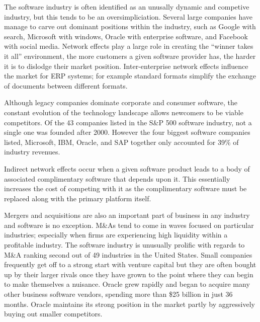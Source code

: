 The software industry is often identified as an unusally dynamic and competive industry, but this tends to be an oversimpliciation.
Several large companies have manage to carve out dominant positions within the industry, such as Google with search, Microsoft with windows, Oracle with enterprise software, and Facebook with social media.\autocite[34]{IndustrySurveysInternet}
Network effects play a large role in creating the ``winner takes it all'' environment, the more customers a given software provider has, the harder it is to dislodge their market position.\autocite[21]{buxmann2012software}
Inter-enterprise network effects influence the market for ERP systems; for example standard formats simplify the exchange of documents between different formats.\autocite[21]{buxmann2012software}

Although legacy companies dominate corporate and consumer software, the constant evolution of the technology landscape allows newcomers to be viable competitors.\autocite[38]{SurveysSoftware2015}
Of the 43 companies listed in the S\&P 500 software industry, not a single one was founded after 2000.\autocite[38]{SurveysSoftware2015}
However the four biggest software companies listed, Microsoft, IBM, Oracle, and SAP together only accounted for 39\% of industry revenues.\autocite[38]{SurveysSoftware2015}

Indirect network effects occur when a given software product leads to a body of associated complimentary software that depends upon it.
This essentially increases the cost of competing with it as the complimentary software must be replaced along with the primary platform itself.\autocite[21]{buxmann2012software}

Mergers and acquisitions are also an important part of business in any industry and software is no exception.\autocite[421]{schief2013mergers}
M\&As tend to come in waves focused on particular industries; especially when firms are experiencing high liquidity within a profitable industry.\autocite[421]{schief2013mergers}
The software industry is unusually prolific with regards to M\&A ranking second out of 49 industries in the United States.\autocite[421]{schief2013mergers}
Small companies frequently get off to a strong start with venture capital but they are often bought up by their larger rivals once they have grown to the point where they can begin to make themselves a nuisance. \autocite[]{LargeParadigmShiftCloudComputing}\autocite[]{ValuelineOverview}
Oracle grew rapidly and began to acquire many other business software vendors, spending more than \$25 billion in just 36 months.\autocite[114]{finkle2012larry}%
Oracle maintains its strong position in the market partly by aggressively buying out smaller competitors.\autocite[121]{finkle2012larry}

